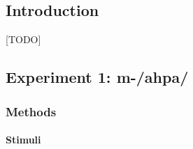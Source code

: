 \subsection{Introduction}

{\color{red}[TODO]}



\subsection{Experiment 1: {\color{red}m-/ahpa/}}
\subsubsection{Methods}
\paragraph{Stimuli}
